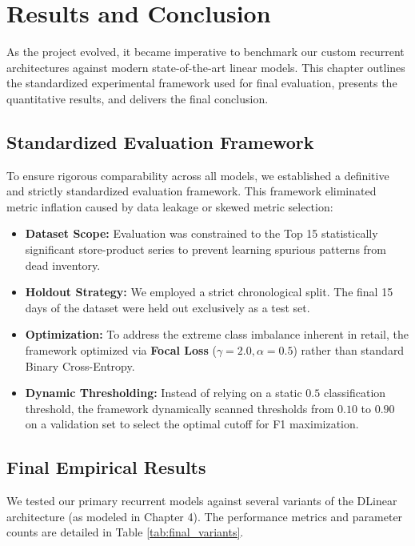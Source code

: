 \chapter{Results and Conclusion}
\label{chap:results}

As the project evolved, it became imperative to benchmark our custom recurrent architectures against modern state-of-the-art linear models. This chapter outlines the standardized experimental framework used for final evaluation, presents the quantitative results, and delivers the final conclusion.

\section{Standardized Evaluation Framework}

To ensure rigorous comparability across all models, we established a definitive and strictly standardized evaluation framework. This framework eliminated metric inflation caused by data leakage or skewed metric selection:
\begin{itemize}
    \item \textbf{Dataset Scope:} Evaluation was constrained to the Top 15 statistically significant store-product series to prevent learning spurious patterns from dead inventory.
    \item \textbf{Holdout Strategy:} We employed a strict chronological split. The final 15 days of the dataset were held out exclusively as a test set. 
    \item \textbf{Optimization:} To address the extreme class imbalance inherent in retail, the framework optimized via \textbf{Focal Loss} ($\gamma = 2.0, \alpha = 0.5$) rather than standard Binary Cross-Entropy.
    \item \textbf{Dynamic Thresholding:} Instead of relying on a static $0.5$ classification threshold, the framework dynamically scanned thresholds from $0.10$ to $0.90$ on a validation set to select the optimal cutoff for F1 maximization.
\end{itemize}

\section{Final Empirical Results}

We tested our primary recurrent models against several variants of the DLinear architecture (as modeled in Chapter 4). The performance metrics and parameter counts are detailed in Table \ref{tab:final_variants}.


